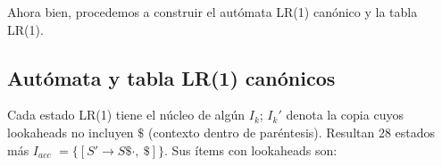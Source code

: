 \documentclass[12pt, letterpaper]{article}
\begin{document}
\begin{enumerate}
\begin{table}[H]
\centering
\footnotesize
{}
\end{table}

Ahora bien, procedemos a construir el autómata LR(1) canónico y la tabla LR(1).

\subsection*{Autómata y tabla LR(1) canónicos}

Cada estado LR(1) tiene el núcleo de algún $I_k$; $I_k'$ denota la copia cuyos lookaheads no incluyen $\$$ (contexto dentro de paréntesis). Resultan 28 estados más $I_{acc}$ $= \{[S' \to S\$\cdot,\ \$]\}$. Sus ítems con lookaheads son:


\end{enumerate}
\end{document}
